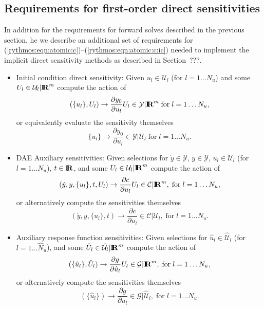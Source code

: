 \documentclass[pdf,ps2pdf,11pt]{SANDreport}
\begin{document}
\subsection{Requirements for first-order direct sensitivities}

In addition for the requirements for forward solves described in the previous
section, he we describe an additional set of requirements for
(\ref{rythmos:eqn:atomic:c})--(\ref{rythmos:eqn:atomic:c:ic}) needed to
implement the implicit direct sensitivity methods as described in Section~???.

\begin{itemize}

{}\item Initial condition direct sensitivity: Given $u_l\in\mathcal{U}_l$ (for
$l=1\ldots{}N_u$) and some $U_l\in\mathcal{U}_l|\mbox{\textbf{I}}\hspace{-0.6ex}\mbox{\textbf{R}}^m$ compute the action of
\[
(\{u_l\},U_l) {}\rightarrow \frac{\partial y_0}{\partial u_l} U_l \in \mathcal{Y}|\mbox{\textbf{I}}\hspace{-0.6ex}\mbox{\textbf{R}}^m
\; \mbox{for} \; l = 1 {}\ldots N_u,
\]
or equivalently evaluate the sensitivity themselves
\[
\{u_l\} {}\rightarrow \frac{\partial y_0}{\partial u_l} \in \mathcal{Y}|\mathcal{U}_l
\; \mbox{for} \; l = 1 {}\ldots N_u.
\]

{}\item DAE Auxiliary sensitivities: Given selections for
$\dot{y}\in\mathcal{Y}$, $y\in\mathcal{Y}$, $u_l\in\mathcal{U}_l$ (for
$l=1\ldots{}N_u$), $t\in\mbox{\textbf{I}}\hspace{-0.6ex}\mbox{\textbf{R}}$, and some $U_l\in\mathcal{U}_l|\mbox{\textbf{I}}\hspace{-0.6ex}\mbox{\textbf{R}}^m$ compute
the action of
\[
(\dot{y},y,\{u_l\},t,U_l) {}\rightarrow \frac{\partial c}{\partial u_l} U_l \in \mathcal{C}|\mbox{\textbf{I}}\hspace{-0.6ex}\mbox{\textbf{R}}^m,
\; \mbox{for} \; l = 1 {}\ldots N_u,
\]
or alternatively compute the sensitivities themselves
\[
(\dot{y},y,\{u_l\},t) {}\rightarrow \frac{\partial c}{\partial u_l} \in \mathcal{C}|\mathcal{U}_l,
\; \mbox{for} \; l = 1 {}\ldots N_u.
\]

{}\item Auxiliary response function sensitivities: Given selections for
$\hat{u}_l\in\hat{\mathcal{U}}_l$ (for $l=1\ldots{}\hat{N}_u$), and some
$\hat{U}_l\in\hat{\mathcal{U}}_l|\mbox{\textbf{I}}\hspace{-0.6ex}\mbox{\textbf{R}}^m$ compute the action of
\[
(\{\hat{u}_l\},\hat{U}_l) {}\rightarrow \frac{\partial g}{\partial \hat{u}_l} U_l \in \mathcal{G}|\mbox{\textbf{I}}\hspace{-0.6ex}\mbox{\textbf{R}}^m,
\; \mbox{for} \; l = 1 {}\ldots N_u,
\]
or alternatively compute the sensitivities themselves
\[
(\{\hat{u}_l\}) {}\rightarrow \frac{\partial g}{\partial u_l} \in \mathcal{G}|\hat{\mathcal{U}}_l,
\; \mbox{for} \; l = 1 {}\ldots N_u.
\]

\end{itemize}
\end{document}
